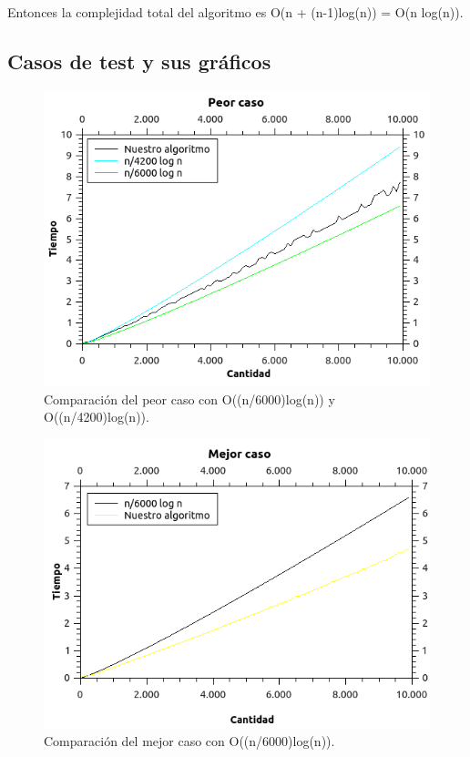 Entonces la complejidad total del algoritmo es O(n + (n-1)log(n)) = O(n log(n)).

\subsection{Casos de test y sus gráficos}

\begin{figure}[H]
\begin{center}

  \includegraphics[width=\linewidth]{../graficos/ej2/Peor.png}
  \caption{{\small Comparación del peor caso con O((n/6000)log(n)) y O((n/4200)log(n)).}} \label{ej2-peor-caso}
\endminipage

\end{center}
\end{figure}


\begin{figure}[H]
\begin{center}

  \includegraphics[width=\linewidth]{../graficos/ej2/Mejor.png}
  \caption{{\small Comparación del mejor caso con O((n/6000)log(n)).}} \label{ej2-mejor-caso}
\endminipage

\end{center}
\end{figure}


